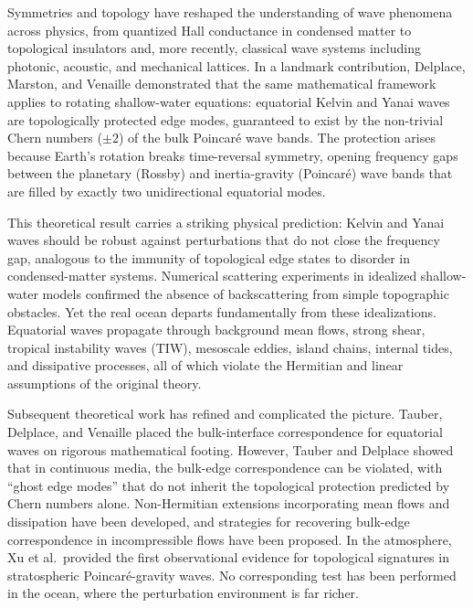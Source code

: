 \documentclass[11pt]{article}
\begin{document}
Symmetries and topology have reshaped the understanding of wave phenomena across physics, from quantized Hall conductance in condensed matter\cite{Thouless1982} to topological insulators\cite{Hasan2010} and, more recently, classical wave systems including photonic, acoustic, and mechanical lattices. In a landmark contribution, Delplace, Marston, and Venaille demonstrated that the same mathematical framework applies to rotating shallow-water equations: equatorial Kelvin and Yanai waves are topologically protected edge modes, guaranteed to exist by the non-trivial Chern numbers ($\pm 2$) of the bulk Poincar\'e wave bands\cite{Delplace2017}. The protection arises because Earth's rotation breaks time-reversal symmetry, opening frequency gaps between the planetary (Rossby) and inertia-gravity (Poincar\'e) wave bands that are filled by exactly two unidirectional equatorial modes\cite{Matsuno1966,Vallis2017,Berry1984}.

This theoretical result carries a striking physical prediction: Kelvin and Yanai waves should be robust against perturbations that do not close the frequency gap, analogous to the immunity of topological edge states to disorder in condensed-matter systems\cite{Hatsugai1993}. Numerical scattering experiments in idealized shallow-water models confirmed the absence of backscattering from simple topographic obstacles\cite{Delplace2017}. Yet the real ocean departs fundamentally from these idealizations. Equatorial waves propagate through background mean flows, strong shear, tropical instability waves (TIW), mesoscale eddies, island chains, internal tides, and dissipative processes, all of which violate the Hermitian and linear assumptions of the original theory\cite{McPhaden1987,Jezequel2023}.

Subsequent theoretical work has refined and complicated the picture. Tauber, Delplace, and Venaille placed the bulk-interface correspondence for equatorial waves on rigorous mathematical footing\cite{Tauber2019}. However, Tauber and Delplace showed that in continuous media, the bulk-edge correspondence can be violated, with ``ghost edge modes'' that do not inherit the topological protection predicted by Chern numbers alone\cite{Tauber2021}. Non-Hermitian extensions incorporating mean flows and dissipation have been developed\cite{Jezequel2023}, and strategies for recovering bulk-edge correspondence in incompressible flows have been proposed\cite{Onuki2024}. In the atmosphere, Xu et al.\ provided the first observational evidence for topological signatures in stratospheric Poincar\'e-gravity waves\cite{Xu2024}. No corresponding test has been performed in the ocean, where the perturbation environment is far richer.
\end{document}
